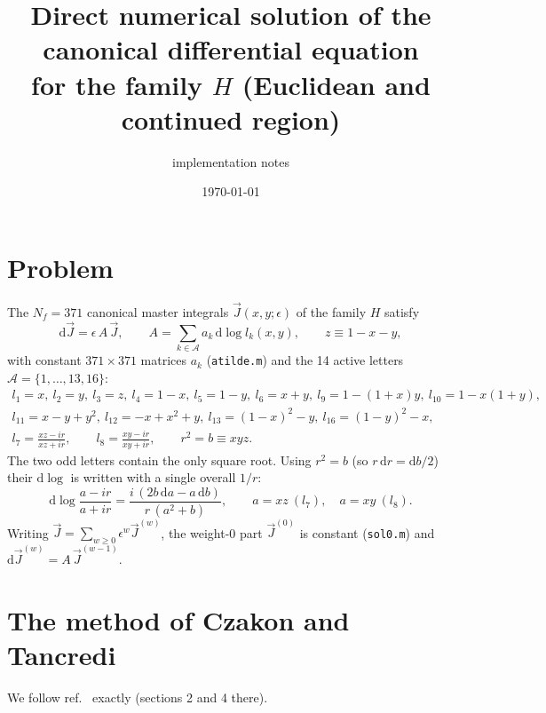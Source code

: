 \documentclass[11pt,a4paper]{article}
\title{Direct numerical solution of the canonical differential equation\\ for the family $H$ (Euclidean and continued region)}
\author{implementation notes}
\date{\today}
\newcommand{\eps}{\epsilon}
\newcommand{\dlog}{\mathrm{d}\!\log}
\begin{document}
\maketitle

\section{Problem}
The $N_f=371$ canonical master integrals $\vec J(x,y;\eps)$ of the family $H$ satisfy
\begin{equation}
  \mathrm d\vec J=\eps\,A\,\vec J,\qquad A=\sum_{k\in\mathcal A} a_k\,\dlog l_k(x,y),\qquad z\equiv 1-x-y ,
\end{equation}
with constant $371\times371$ matrices $a_k$ (\texttt{atilde.m}) and the 14 active letters
$\mathcal A=\{1,\dots,13,16\}$:
\begin{gather*}
 l_1=x,\ l_2=y,\ l_3=z,\ l_4=1-x,\ l_5=1-y,\ l_6=x+y,\ l_9=1-(1+x)y,\ l_{10}=1-x(1+y),\\
 l_{11}=x-y+y^2,\ l_{12}=-x+x^2+y,\ l_{13}=(1-x)^2-y,\ l_{16}=(1-y)^2-x,\\
 l_7=\frac{xz-i r}{xz+i r},\qquad l_8=\frac{xy-i r}{xy+i r},\qquad r^2=b\equiv xyz .
\end{gather*}
The two odd letters contain the only square root.  Using $r^2=b$ (so $r\,\mathrm dr=\mathrm db/2$) their
$\dlog$ is written with a single overall $1/r$:
\begin{equation}\label{eq:odd}
 \dlog\frac{a-ir}{a+ir}=\frac{i\,(2b\,\mathrm da-a\,\mathrm db)}{r\,(a^2+b)},\qquad a=xz\ (l_7),\quad a=xy\ (l_8).
\end{equation}
Writing $\vec J=\sum_{w\ge0}\eps^w\vec J^{(w)}$, the weight-0 part $\vec J^{(0)}$ is constant (\texttt{sol0.m})
and $\mathrm d\vec J^{(w)}=A\,\vec J^{(w-1)}$.

\section{The method of Czakon and Tancredi}
We follow ref.~\cite{CT} exactly (sections 2 and 4 there).
\end{document}
